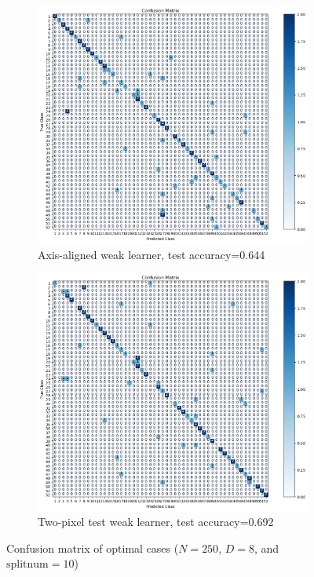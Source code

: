 \begin{figure}[htbp]
	\centering
	\begin{subfigure}[t]{0.4\linewidth}
		\centering
		\includegraphics[width=\linewidth]{image/q5-fig6.png}
		\caption{Axis-aligned weak learner, test accuracy=0.644}
		\label{fig:q5-fig6}
	\end{subfigure}%
	\quad
	\begin{subfigure}[t]{0.4\linewidth}
		\centering
		\includegraphics[width=\linewidth]{image/q5-fig8.png}
		\caption{Two-pixel test weak learner, test accuracy=0.692}
		\label{fig:q5-fig8}
	\end{subfigure}
	\caption{Confusion matrix of optimal cases ($N=250$, $D=8$, and $\text{splitnum}=10$)}
	\label{fig:app-q5-6}
\end{figure}

